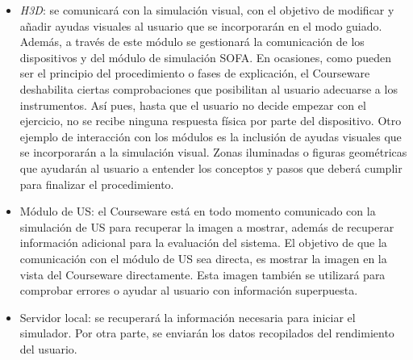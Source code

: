 \begin{itemize}
    
    \item \emph{H3D}: se comunicará con la simulación visual, con el objetivo de modificar y añadir ayudas visuales al usuario que se incorporarán en el modo guiado. Además, a través de este módulo se gestionará la comunicación de los dispositivos y del módulo de simulación \acs{SOFA}. En ocasiones, como pueden ser el principio del procedimiento o fases de explicación, el \ac{Courseware} deshabilita ciertas comprobaciones que posibilitan al usuario adecuarse a los instrumentos. Así pues, hasta que el usuario no decide empezar con el ejercicio, no se recibe ninguna respuesta física por parte del dispositivo. Otro ejemplo de interacción con los módulos es la inclusión de ayudas visuales que se incorporarán a la simulación visual. Zonas iluminadas o figuras geométricas que ayudarán al usuario a entender los conceptos y pasos que deberá cumplir para finalizar el procedimiento. 
    
    \item Módulo de \ac{US}: el \ac{Courseware} está en todo momento comunicado con la simulación de \ac{US} para recuperar la imagen a mostrar, además de recuperar información adicional para la evaluación del sistema. El objetivo de que la comunicación con el módulo de \ac{US} sea directa, es mostrar la imagen en la vista del \ac{Courseware} directamente. Esta imagen también se utilizará para comprobar errores o ayudar al usuario con información superpuesta.
    


\item Servidor local: se recuperará la información necesaria para iniciar el simulador. Por otra parte, se enviarán los datos recopilados del rendimiento del usuario.


\end{itemize}




